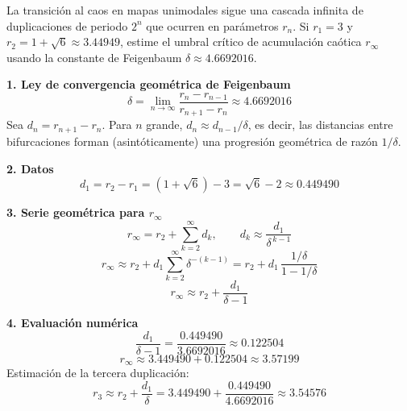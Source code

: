 \documentclass[11pt,a4paper]{article}
\newenvironment{solucion}[1][Solución Detallada]{%
    \vspace{1.5mm}%
    \noindent{\large\textbf{Solución:}}\par\vspace{1.5mm}%
}{%
    \par\vspace{3mm}%
}
\begin{document}
\vspace{3mm}

\begin{problema}[Problema 4.3]
La transición al caos en mapas unimodales sigue una cascada infinita de duplicaciones de periodo $2^n$ que ocurren en parámetros $r_n$. Si $r_1 = 3$ y $r_2 = 1 + \sqrt{6} \approx 3.44949$, estime el umbral crítico de acumulación caótica $r_\infty$ usando la constante de Feigenbaum $\delta \approx 4.6692016$.
\end{problema}

\begin{solucion}

\textbf{\large 1. Ley de convergencia geométrica de Feigenbaum}
\[
\boxed{\delta = \lim_{n \to \infty} \frac{r_n - r_{n-1}}{r_{n+1} - r_n} \approx 4.6692016}
\]
Sea $d_n = r_{n+1} - r_n$. Para $n$ grande, $d_n \approx d_{n-1}/\delta$, es decir, las distancias entre bifurcaciones forman (asintóticamente) una progresión geométrica de razón $1/\delta$.

\vspace{3.5mm}

\textbf{\large 2. Datos}
\[
d_1 = r_2 - r_1 = (1 + \sqrt{6}) - 3 = \sqrt{6} - 2 \approx 0.449490
\]

\vspace{3.5mm}

\textbf{\large 3. Serie geométrica para $r_\infty$}
\[
r_\infty = r_2 + \sum_{k=2}^{\infty} d_k, \qquad d_k \approx \frac{d_1}{\delta^{\,k-1}}
\]
\[
r_\infty \approx r_2 + d_1 \sum_{k=2}^\infty \delta^{-(k-1)} = r_2 + d_1\,\frac{1/\delta}{1 - 1/\delta}
\]
\[
\boxed{r_\infty \approx r_2 + \frac{d_1}{\delta - 1}}
\]

\vspace{3.5mm}

\textbf{\large 4. Evaluación numérica}
\[
\frac{d_1}{\delta - 1} = \frac{0.449490}{3.6692016} \approx 0.122504
\]
\[
\boxed{r_\infty \approx 3.449490 + 0.122504 \approx 3.57199}
\]
Estimación de la tercera duplicación:
\[
r_3 \approx r_2 + \frac{d_1}{\delta} = 3.449490 + \frac{0.449490}{4.6692016} \approx 3.54576
\]

\vspace{3.5mm}


\end{solucion}
\end{document}
